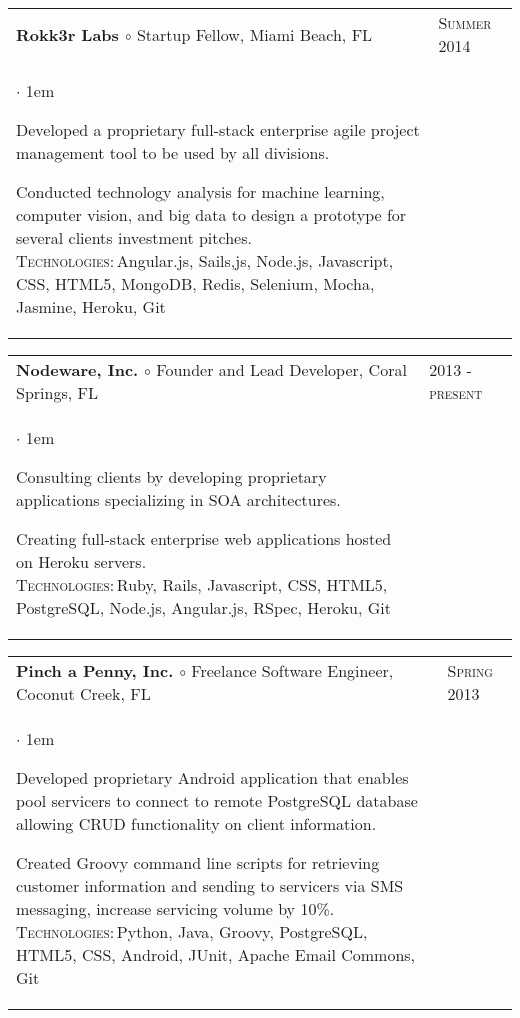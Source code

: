 \documentclass[11pt]{article}
\makeatletter
\newcommand{\employer}[4]
    {{ \begin{tabular}{l@{\hspace{5mm}}|p{30mm}}
       \multicolumn{1}{l}{\textbf{#1 $\circ$ }#2}&\multicolumn{1}{p{30mm}}{\hspace{-3mm}\textsc{#3}} \\
       \parbox{.825\textwidth}{#4 \vspace*{-4pt}}
       \end{tabular} \vspace{4pt} }}
\newenvironment{achievements}           %
    {\begin{list}{$\cdot$}{\topsep 0pt \itemsep 4pt \parsep 0pt \leftmargin 1em}
     \linespread{1.05} \selectfont %
    }
    {\end{list}\vspace*{4pt}}
\def\kt{\vspace*{2pt}\\\textsc{Technologies:\,}}
\makeatother
\begin{document}
\employer{Rokk3r Labs}{Startup Fellow, Miami Beach, FL}{Summer 2014}{
\begin{achievements}

\item{Developed a proprietary full-stack enterprise agile project management tool to be used by all divisions.}

\item{Conducted technology analysis for machine learning, computer vision, and big data to design a prototype for several clients investment pitches. \kt Angular.js, Sails,js, Node.js, Javascript, CSS, HTML5, MongoDB, Redis, Selenium, Mocha, Jasmine, Heroku, Git}

\end{achievements} 
}

\employer{Nodeware, Inc.}{Founder and Lead Developer, Coral Springs, FL}{2013 - present}{
\begin{achievements}

\item{Consulting clients by developing proprietary applications specializing in SOA architectures.}

\item{Creating full-stack enterprise web applications hosted on Heroku servers. \kt Ruby, Rails, Javascript, CSS, HTML5, PostgreSQL, Node.js, Angular.js, RSpec, Heroku, Git}

\end{achievements} 
}


\employer{Pinch a Penny, Inc.}{Freelance Software Engineer, Coconut Creek, FL}{Spring 2013}{
    \begin{achievements}
    
    \item{Developed proprietary Android application that enables pool servicers to connect to remote PostgreSQL database allowing CRUD functionality on client information.}
    
    \item{Created Groovy command line scripts for retrieving customer information and sending to servicers via SMS messaging, increase servicing volume by 10\%.  \kt Python, Java, Groovy, PostgreSQL, HTML5, CSS, Android, JUnit, Apache Email Commons, Git}
    
    \end{achievements}
}
\end{document}
